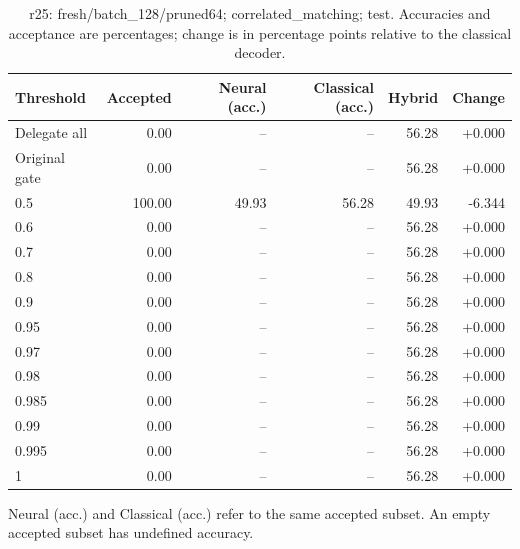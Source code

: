 \begin{table}[htbp]
\centering\small
\setlength{\tabcolsep}{3pt}
\caption{r25: fresh/batch\_128/pruned64; correlated\_matching; test. Accuracies and acceptance are percentages; change is in percentage points relative to the classical decoder.}
\begin{tabular}{lrrrrr}
\toprule
Threshold & Accepted & Neural (acc.) & Classical (acc.) & Hybrid & Change \\
\midrule
Delegate all & 0.00 & -- & -- & 56.28 & +0.000 \\
Original gate & 0.00 & -- & -- & 56.28 & +0.000 \\
0.5 & 100.00 & 49.93 & 56.28 & 49.93 & -6.344 \\
0.6 & 0.00 & -- & -- & 56.28 & +0.000 \\
0.7 & 0.00 & -- & -- & 56.28 & +0.000 \\
0.8 & 0.00 & -- & -- & 56.28 & +0.000 \\
0.9 & 0.00 & -- & -- & 56.28 & +0.000 \\
0.95 & 0.00 & -- & -- & 56.28 & +0.000 \\
0.97 & 0.00 & -- & -- & 56.28 & +0.000 \\
0.98 & 0.00 & -- & -- & 56.28 & +0.000 \\
0.985 & 0.00 & -- & -- & 56.28 & +0.000 \\
0.99 & 0.00 & -- & -- & 56.28 & +0.000 \\
0.995 & 0.00 & -- & -- & 56.28 & +0.000 \\
1 & 0.00 & -- & -- & 56.28 & +0.000 \\
\bottomrule
\end{tabular}
\par\smallskip\footnotesize Neural (acc.) and Classical (acc.) refer to the same accepted subset. An empty accepted subset has undefined accuracy.
\end{table}
